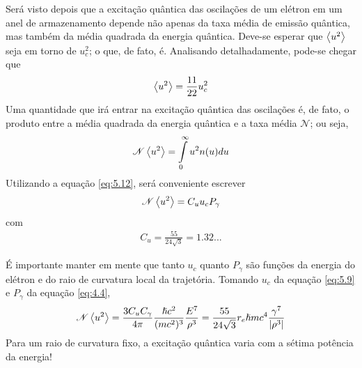 Será visto depois que a excitação quântica das oscilações de um elétron em um anel de armazenamento depende não apenas da taxa média de emissão quântica, mas também da média quadrada da energia quântica. Deve-se esperar que $\left< u^2 \right>$ seja em torno de $u_c^2$; o que, de fato, é. Analisando detalhadamente, pode-se chegar que
\begin{align}
	\left< u^2 \right> = \frac{11}{22}u_c^2
\end{align}
Uma quantidade que irá entrar na excitação quântica das oscilações é, de fato, o produto entre a média quadrada da energia quântica e a taxa média $\mathscr{N}$; ou seja,
\begin{align}
	\mathscr{N}\left< u^2 \right> = \int\limits_{0}^{\infty}u^2n(u)du
\end{align}
Utilizando a equação \eqref{eq:5.12}, será conveniente escrever
\begin{align}
	\mathscr{N}\left< u^2 \right> = C_u u_c P_\gamma
\end{align}
com
\begin{align}
	C_u = \frac{55}{24\sqrt{3}} = 1.32...
\end{align}

É importante manter em mente que tanto $u_c$ quanto $P_\gamma$ são funções da energia do elétron e do raio de curvatura local da trajetória. Tomando $u_c$ da equação \eqref{eq:5.9} e $P_\gamma$ da equação \eqref{eq:4.4},
\begin{align}
	\mathscr{N}\left< u^2 \right> = \frac{3C_u C_\gamma}{4\pi}\frac{\hslash c^2}{(mc^2)^3}\frac{E^7}{\rho^3} = \frac{55}{24\sqrt{3}}r_e \hslash mc^4 \frac{\gamma^7}{|\rho^3|}
\end{align}
Para um raio de curvatura fixo, a excitação quântica varia com a sétima potência da energia!